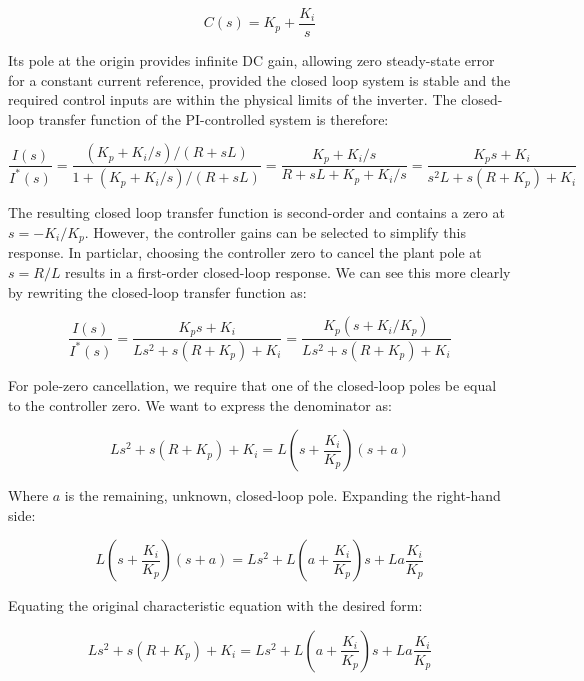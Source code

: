\documentclass{article}
\begin{document}
\begin{equation}
    C(s) = K_p + \frac{K_i}{s}
\end{equation}

Its pole at the origin provides infinite DC gain, allowing zero steady-state error for a constant current reference, provided the closed loop system is stable and the required control inputs are within the physical limits of the inverter. The closed-loop transfer function of the PI-controlled system is therefore:

\begin{equation}
    \frac{I(s)}{I^*(s)} = \frac{(K_p + K_i/s)/(R + sL)}{1 + (K_p + K_i/s)/(R + sL)} = \frac{K_p + K_i/s}{R + sL + K_p + K_i/s} = \frac{K_ps + K_i}{s^2L + s(R + K_p) + K_i}
\end{equation}

The resulting closed loop transfer function is second-order and contains a zero at $s = -K_i/K_p$. However, the controller gains can be selected to simplify this response. In particlar, choosing the controller zero to cancel the plant pole at $s = R/L$ results in a first-order closed-loop response. We can see this more clearly by rewriting the closed-loop transfer function as:

\begin{equation}
    \frac{I(s)}{I^*(s)} = \frac{K_ps + K_i}{Ls^2 + s(R + K_p) + K_i} = \frac{K_p(s + K_i/K_p)}{Ls^2 + s(R + K_p) + K_i}
\end{equation}

For pole-zero cancellation, we require that one of the closed-loop poles be equal to the controller zero. We want to express the denominator as:

\begin{equation}
\label{eqn:desired-char-eq}
    Ls^2 + s(R + K_p) + K_i = L\left(s + \frac{K_i}{K_p}\right)(s + a)
\end{equation}

Where $a$ is the remaining, unknown, closed-loop pole. Expanding the right-hand side:

\begin{equation}
    L\left(s + \frac{K_i}{K_p}\right)(s + a) = Ls^2 + L\left(a + \frac{K_i}{K_p}\right)s + La\frac{K_i}{K_p}
\end{equation}

Equating the original characteristic equation with the desired form:

\begin{equation}
    Ls^2 + s(R + K_p) + K_i = Ls^2 + L\left(a + \frac{K_i}{K_p}\right)s + La\frac{K_i}{K_p}
\end{equation}
\end{document}
